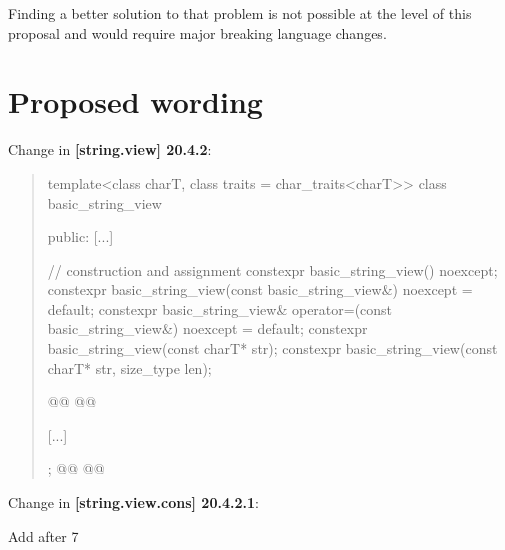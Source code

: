 \documentclass{wg21}
\begin{document}
Finding a better solution to that problem is not possible at the level of this proposal and would require major breaking language changes.





\section{Proposed wording}

Change in \textbf{[string.view] 20.4.2}:
\begin{quote}
\begin{codeblock}

template<class charT, class traits = char_traits<charT>>
class basic_string_view {
public:
    [...]

    // construction and assignment
    constexpr basic_string_view() noexcept;
    constexpr basic_string_view(const basic_string_view&) noexcept = default;
    constexpr basic_string_view& operator=(const basic_string_view&) noexcept = default;
    constexpr basic_string_view(const charT* str);
    constexpr basic_string_view(const charT* str, size_type len);

    

    @@
    @@

    [...]
};
@@
@@


\end{codeblock}
\end{quote}


Change in \textbf{[string.view.cons] 20.4.2.1}:

Add after 7
\end{document}

